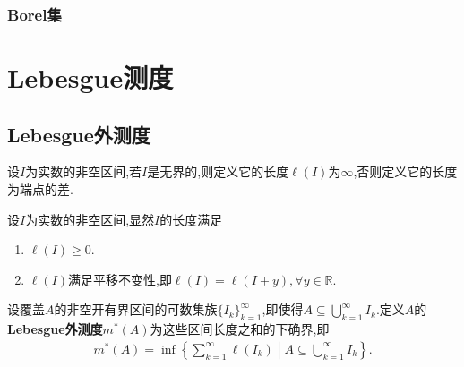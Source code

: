 \documentclass[lang=cn,newtx,10pt,scheme=chinese]{../Template/elegantbook}
\begin{document}
\subsection{Borel集}

\begin{definition}
  
\end{definition}


\chapter{Lebesgue测度}

\section{Lebesgue外测度}

\begin{definition}[区间的长度]\label{definitionL:区间的长度}
  设$I$为实数的非空区间,若$I$是无界的,则定义它的长度$\ell(I)$为$\infty$,否则定义它的长度为端点的差.
\end{definition}
\begin{note}
  设$I$为实数的非空区间,显然$I$的长度满足
\begin{enumerate}[(1)]
  \item $\ell(I)\geqslant0$.
  
  \item $\ell(I)$满足平移不变性,即$\ell(I)=\ell(I+y),\forall y\in \mathbb{R}$.
\end{enumerate}
\end{note}

\begin{definition}[Lebesgue外测度]\label{definition:Lebesgue外测度}
  设覆盖$A$的非空开有界区间的可数集族$\{I_k\}_{k=1}^\infty$,即使得$A\subseteq\bigcup_{k=1}^\infty I_k$.定义$A$的\textbf{Lebesgue外测度}$m^*(A)$为这些区间长度之和的下确界,即
  \begin{align*}
    m^*(A)=\inf\left\{\sum_{k=1}^\infty\ell(I_k)\middle|A\subseteq\bigcup_{k=1}^\infty I_k\right\}.
  \end{align*}
\end{definition}
\end{document}
